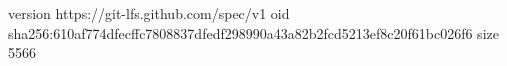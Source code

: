 version https://git-lfs.github.com/spec/v1
oid sha256:610af774dfecffc7808837dfedf298990a43a82b2fcd5213ef8c20f61bc026f6
size 5566
